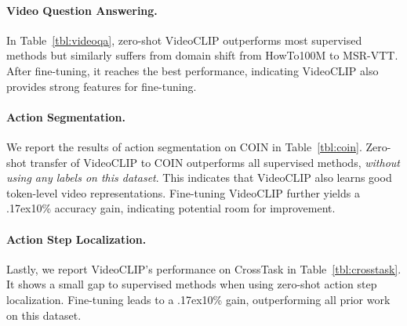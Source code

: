 \documentclass[11pt]{article}
\newcommand{\app}{\raise.17ex\hbox{}}
\begin{document}
\paragraph{Video Question Answering.} 
In Table~\ref{tbl:videoqa}, zero-shot VideoCLIP outperforms most supervised methods but similarly suffers from domain shift from HowTo100M to MSR-VTT.
After fine-tuning, it reaches the best performance, indicating VideoCLIP also provides strong features for fine-tuning.


\paragraph{Action Segmentation.} We report the results of action segmentation on COIN in Table~\ref{tbl:coin}. Zero-shot transfer of VideoCLIP to COIN outperforms all supervised methods, \textit{without using any labels on this dataset}.
This indicates that VideoCLIP also learns good token-level video representations.
Fine-tuning VideoCLIP further yields a \app10\% accuracy gain, indicating potential room for improvement.


\paragraph{Action Step Localization.}
Lastly, we report VideoCLIP's performance on CrossTask in Table~\ref{tbl:crosstask}.
It shows a small gap to supervised methods when using zero-shot action step localization. 
Fine-tuning leads to a \app10\% gain, outperforming all prior work on this dataset.

\begin{table}[!t]
\centering
\setlength\tabcolsep{2.0pt}
\caption{\textit{Action step localization}  on CrossTask.}
\label{tbl:crosstask}
\end{table}
\end{document}
